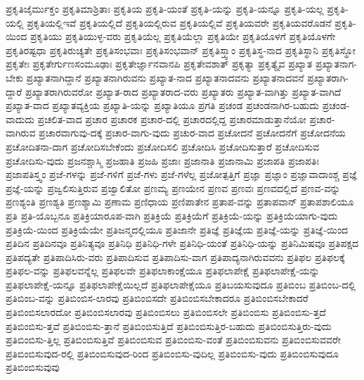 {ಪ್ರಕೃತಿಜೈರ್ಮುಕ್ತಂ
ಪ್ರಕೃತಿಮಾಶ್ರಿತಾಃ
ಪ್ರಕೃತಿಯ
ಪ್ರಕೃತಿ-ಯಂತೆ
ಪ್ರಕೃತಿ-ಯನ್ನು
ಪ್ರಕೃತಿ-ಯನ್ನೂ
ಪ್ರಕೃತಿ-ಯಲ್ಲ
ಪ್ರಕೃತಿ-ಯಲ್ಲಿ
ಪ್ರಕೃತಿಯಲ್ಲಿಇವೆ
ಪ್ರಕೃತಿಯಲ್ಲಿದೆ
ಪ್ರಕೃತಿಯಲ್ಲಿರುವ
ಪ್ರಕೃತಿಯಲ್ಲಿವೆ
ಪ್ರಕೃತಿಯವರೇ
ಪ್ರಕೃತಿಯವರೊಡನೆ
ಪ್ರಕೃತಿ-ಯಿಂದ
ಪ್ರಕೃತಿಯು
ಪ್ರಕೃತಿಯುಳ್ಳ-ವರು
ಪ್ರಕೃತಿಯೆಲ್ಲ
ಪ್ರಕೃತಿಯೆಲ್ಲಾ
ಪ್ರಕೃತಿಯೇ
ಪ್ರಕೃತಿಯೊಳಗೆ
ಪ್ರಕೃತಿಯೊಳಗೇ
ಪ್ರಕೃತಿರಷ್ಟಧಾ
ಪ್ರಕೃತಿರುಚ್ಯತೇ
ಪ್ರಕೃತಿಸಂಭವಾಃ
ಪ್ರಕೃತಿಸಂಭವಾನ್
ಪ್ರಕೃತಿಸ್ತ್ವಾಂ
ಪ್ರಕೃತಿಸ್ಥ-ನಾದ
ಪ್ರಕೃತಿಸ್ಥಾನಿ
ಪ್ರಕೃತಿಸ್ಥೋ
ಪ್ರಕೃತೇಃ
ಪ್ರಕೃತೇರ್ಗುಣಸಂಮೂಢಾಃ
ಪ್ರಕೃತೇರ್ಜ್ಞಾನವಾನಪಿ
ಪ್ರಕೃತೇವಶಾತ್
ಪ್ರಕೃತ್ಯಾ
ಪ್ರಕೃತ್ಯೈವ
ಪ್ರಖ್ಯಾತ
ಪ್ರಖ್ಯಾತನಾಗ-ಬೇಕು
ಪ್ರಖ್ಯಾತನಾಗಿದ್ದಾನೆ
ಪ್ರಖ್ಯಾತನಾಗಿರುವನು
ಪ್ರಖ್ಯಾತ-ನಾದ
ಪ್ರಖ್ಯಾತನಾದವನು
ಪ್ರಖ್ಯಾತನಾದವನೆ
ಪ್ರಖ್ಯಾತರಾಗಿ-ದ್ದಾರೆ
ಪ್ರಖ್ಯಾತರಾಗಿರುವರೋ
ಪ್ರಖ್ಯಾತ-ರಾದ
ಪ್ರಖ್ಯಾತರಾದ-ವರು
ಪ್ರಖ್ಯಾತರು
ಪ್ರಖ್ಯಾತ-ವಾಗಿತ್ತು
ಪ್ರಖ್ಯಾತ-ವಾಗಿದೆ
ಪ್ರಖ್ಯಾತ-ವಾದ
ಪ್ರಖ್ಯಾತವ್ಯಕ್ತಿಯ
ಪ್ರಖ್ಯಾತಿ-ಯನ್ನು
ಪ್ರಖ್ಯಾತಿಯೂ
ಪ್ರಗತಿ
ಪ್ರಚಂಡ
ಪ್ರಚಂಡನಾಗಿರ-ಬಹುದು
ಪ್ರಚಂಡ-ವಾದುದು
ಪ್ರಚಲಿತ-ವಾದ
ಪ್ರಚಾರ
ಪ್ರಚಾರಕ
ಪ್ರಚಾರ-ದಲ್ಲಿ
ಪ್ರಚಾರದಲ್ಲಿದ್ದ
ಪ್ರಚಾರಮಾಡುತ್ತಾನೆಯೋ
ಪ್ರಚಾರ-ವಾಗಿರುವ
ಪ್ರಚಾರವಾಗುವು-ದಕ್ಕೆ
ಪ್ರಚಾರ-ವಾಗು-ವುದು
ಪ್ರಚುರ-ವಾದ
ಪ್ರಚೋದನೆ
ಪ್ರಚೋದನೆಗೆ
ಪ್ರಚೋದನೆಯ
ಪ್ರಚೋದಿತನಾ-ದಾಗ
ಪ್ರಚೋದಿಸಬೇಕೆಂದು
ಪ್ರಚೋದಿಸಲಿ
ಪ್ರಚೋದಿಸಿ
ಪ್ರಚೋದಿಸುತ್ತಾರೆ
ಪ್ರಚೋದಿಸುವ
ಪ್ರಚೋದಿಸು-ವುದು
ಪ್ರಜನಶ್ಚಾಸ್ಮಿ
ಪ್ರಜಹಾತಿ
ಪ್ರಜಹಿ
ಪ್ರಜಾಃ
ಪ್ರಜಾನಾತಿ
ಪ್ರಜಾನಾಮಿ
ಪ್ರಜಾಪತಿ
ಪ್ರಜಾಪತಿಃ
ಪ್ರಜಾಪತಿಸ್ತ್ವಂ
ಪ್ರಜೆ-ಗಳನ್ನು
ಪ್ರಜೆ-ಗಳಿಗೆ
ಪ್ರಜೆ-ಗಳು
ಪ್ರಜೆ-ಗಳೆಲ್ಲ
ಪ್ರಜೋತ್ಪತ್ತಿಗೆ
ಪ್ರಜ್ಞಾ
ಪ್ರಜ್ಞಾಂ
ಪ್ರಜ್ಞಾವಾದಾಂಶ್ಚ
ಪ್ರಜ್ಞೆ
ಪ್ರಜ್ಞೆ-ಯನ್ನು
ಪ್ರಜ್ವಲಿಸುತ್ತಿರುವ
ಪ್ರಜ್ವಾಲಿತೋ
ಪ್ರಣಮ್ಯ
ಪ್ರಣಯೇನ
ಪ್ರಣವ
ಪ್ರಣವಃ
ಪ್ರಣವದಲ್ಲಿದೆ
ಪ್ರಣವ-ವನ್ನು
ಪ್ರಣಶ್ಯಂತಿ
ಪ್ರಣಶ್ಯತಿ
ಪ್ರಣಶ್ಯಾಮಿ
ಪ್ರಣಾಮ
ಪ್ರಣಿಧಾಯ
ಪ್ರಣಿಪಾತೇನ
ಪ್ರತಾಪ-ವನ್ನು
ಪ್ರತಾಪವಾನ್
ಪ್ರತಾಪಶಾಲಿಯೂ
ಪ್ರತಿ
ಪ್ರತಿ-ಯೊಬ್ಬನೂ
ಪ್ರತಿಕ್ರಿಯಾರೂಪ-ವಾಗಿ
ಪ್ರತಿಕ್ರಿಯೆ
ಪ್ರತಿಕ್ರಿಯೆಗೆ
ಪ್ರತಿಕ್ರಿಯೆ-ಯನ್ನು
ಪ್ರತಿಕ್ರಿಯೆಯಾಗು-ವುದು
ಪ್ರತಿಕ್ರಿಯೆ-ಯಿಂದ
ಪ್ರತಿಕ್ರಿಯೆಯೇ
ಪ್ರತಿಜನ್ಮದಲ್ಲಿಯೂ
ಪ್ರತಿಜಾನೇ
ಪ್ರತಿಜ್ಞೆ
ಪ್ರತಿಜ್ಞೆಯ
ಪ್ರತಿಜ್ಞೆ-ಯನ್ನು
ಪ್ರತಿಜ್ಞೆ-ಯಿಂದ
ಪ್ರತಿದಿನ
ಪ್ರತಿದಿನವೂ
ಪ್ರತಿನಿತ್ಯವೂ
ಪ್ರತಿನಿಧಿ
ಪ್ರತಿನಿಧಿ-ಗಳೇ
ಪ್ರತಿನಿಧಿ-ಯಂತೆ
ಪ್ರತಿನಿಧಿ-ಯನ್ನು
ಪ್ರತಿನಿಮಿಷವೂ
ಪ್ರತಿಪಕ್ಷದ
ಪ್ರತಿಪದ್ಯತೇ
ಪ್ರತಿಪಾದಿಸಿರು-ವರು
ಪ್ರತಿಪಾದಿಸುವ
ಪ್ರತಿಪಾದಿಸು-ವಾಗ
ಪ್ರತಿಪಾದ್ಯನಾಗಿರುವವನು
ಪ್ರತಿಫಲ
ಪ್ರತಿಫಲಕ್ಕೆ
ಪ್ರತಿಫಲ-ವನ್ನು
ಪ್ರತಿಫಲವನ್ನೆಲ್ಲ
ಪ್ರತಿಫಲವೇ
ಪ್ರತಿಫಲಾಕಾಂಕ್ಷೆಯೂ
ಪ್ರತಿಫಲಾಪೇಕ್ಷೆ
ಪ್ರತಿಫಲಾಪೇಕ್ಷೆ-ಯನ್ನು
ಪ್ರತಿಫಲಾಪೇಕ್ಷೆ-ಯನ್ನೂ
ಪ್ರತಿಫಲಾಪೇಕ್ಷೆಯಿಲ್ಲದೆ
ಪ್ರತಿಫಲಾಪೇಕ್ಷೆಯೂ
ಪ್ರತಿಬಯಸುವುದೂ
ಪ್ರತಿಬಿಂಬ
ಪ್ರತಿಬಿಂಬ-ದಲ್ಲಿ
ಪ್ರತಿಬಿಂಬ-ವನ್ನು
ಪ್ರತಿಬಿಂಬಿಸ-ಲಾರವು
ಪ್ರತಿಬಿಂಬಿಸದೇ
ಪ್ರತಿಬಿಂಬಿಸಬೇಕಾದರೂ
ಪ್ರತಿಬಿಂಬಿಸಬೇಕಾದರೆ
ಪ್ರತಿಬಿಂಬಿಸಲಾರದೋ
ಪ್ರತಿಬಿಂಬಿಸಲಾರವು
ಪ್ರತಿಬಿಂಬಿಸಲು
ಪ್ರತಿಬಿಂಬಿಸಲೇ
ಪ್ರತಿಬಿಂಬಿಸು
ಪ್ರತಿಬಿಂಬಿಸು-ತ್ತದೆ
ಪ್ರತಿಬಿಂಬಿಸು-ತ್ತವೆ
ಪ್ರತಿಬಿಂಬಿಸು-ತ್ತಾನೆ
ಪ್ರತಿಬಿಂಬಿಸುತ್ತಿದೆ
ಪ್ರತಿಬಿಂಬಿಸುತ್ತಿರ-ಬಹುದು
ಪ್ರತಿಬಿಂಬಿಸುತ್ತಿರು-ವುದು
ಪ್ರತಿಬಿಂಬಿಸು-ತ್ತಿಲ್ಲ
ಪ್ರತಿಬಿಂಬಿಸುತ್ತಿವೆ
ಪ್ರತಿಬಿಂಬಿಸುವ
ಪ್ರತಿಬಿಂಬಿಸು-ವಂತೆ
ಪ್ರತಿಬಿಂಬಿಸುವನು
ಪ್ರತಿಬಿಂಬಿಸುವವರೇ
ಪ್ರತಿಬಿಂಬಿಸುವುದ-ರಲ್ಲಿ
ಪ್ರತಿಬಿಂಬಿಸುವುದ-ರಿಂದ
ಪ್ರತಿಬಿಂಬಿಸು-ವುದಿಲ್ಲ
ಪ್ರತಿಬಿಂಬಿಸು-ವುದು
ಪ್ರತಿಬಿಂಬಿಸುವುದೂ
ಪ್ರತಿಬಿಂಬಿಸುವುವು
}
